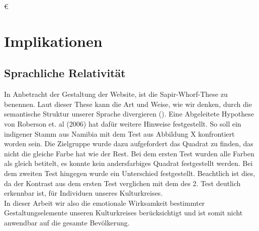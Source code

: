 €\documentclass[./dokumentation.tex]{subfiles}
\begin{document}
\section{Implikationen}
\subsection{Sprachliche Relativität}
In Anbetracht der Gestaltung der Website, ist die Sapir-Whorf-These zu benennen. Laut dieser These kann die Art und Weise, wie wir denken, durch die semantische Struktur unserer Sprache divergieren (\cite{Cibelli2016}). Eine Abgeleitete Hypothese von Roberson et. al (2006) hat dafür weitere Hinweise festgestellt. So soll ein indigener Stamm aus Namibia mit dem Test aus Abbildung X konfrontiert worden sein. Die Zielgruppe wurde dazu aufgefordert das Quadrat zu finden, das nicht die gleiche Farbe hat wie der Rest. Bei dem ersten Test wurden alle Farben als gleich betitelt, es konnte kein andersfarbiges Quadrat festgestellt werden. Bei dem zweiten Test hingegen wurde ein Unterschied festgestellt. Beachtlich ist dies, da der Kontrast aus dem ersten Test verglichen mit dem des 2. Test deutlich erkennbar  ist, für Individuen unseres Kulturkreises.\\
In dieser Arbeit wir also die emotionale Wirksamkeit bestimmter Gestaltungselemente unseren Kulturkreises berücksichtigt und ist somit nicht anwendbar auf die gesamte Bevölkerung. 
\end{document}
